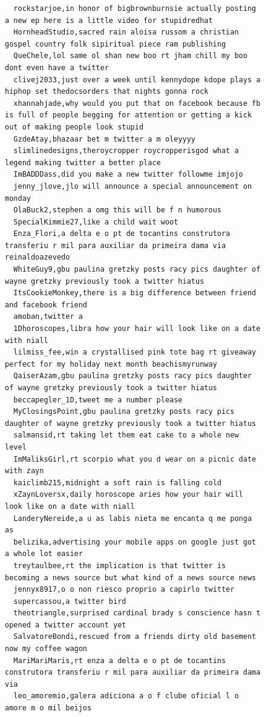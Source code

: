\begin{figure}[htpb]
\begin{verbatim}
  rockstarjoe,in honor of bigbrownburnsie actually posting a new ep here is a little video for stupidredhat
  HornheadStudio,sacred rain aloisa russom a christian gospel country folk sipiritual piece ram publishing
  QueChele,lol same ol shan new boo rt jham chill my boo dont even have a twitter
  clivej2033,just over a week until kennydope kdope plays a hiphop set thedocsorders that nights gonna rock
  xhannahjade,why would you put that on facebook because fb is full of people begging for attention or getting a kick out of making people look stupid
  GzdeAtay,bhazaar bet m twitter a m oleyyyy
  slimlinedesigns,theroycropper roycropperisgod what a legend making twitter a better place
  ImBADDDass,did you make a new twitter followme imjojo
  jenny_jlove,jlo will announce a special announcement on monday
  OlaBuck2,stephen a omg this will be f n humorous
  SpecialKimmie27,like a child wait woot
  Enza_Flori,a delta e o pt de tocantins construtora transferiu r mil para auxiliar da primeira dama via reinaldoazevedo
  WhiteGuy9,gbu paulina gretzky posts racy pics daughter of wayne gretzky previously took a twitter hiatus
  ItsCookieMonkey,there is a big difference between friend and facebook friend
  amoban,twitter a
  1Dhoroscopes,libra how your hair will look like on a date with niall
  lilmiss_fee,win a crystallised pink tote bag rt giveaway perfect for my holiday next month beachismyrunway
  QaiserAzam,gbu paulina gretzky posts racy pics daughter of wayne gretzky previously took a twitter hiatus
  beccapegler_1D,tweet me a number please
  MyClosingsPoint,gbu paulina gretzky posts racy pics daughter of wayne gretzky previously took a twitter hiatus
  salmansid,rt taking let them eat cake to a whole new level
  ImMaliksGirl,rt scorpio what you d wear on a picnic date with zayn
  kaiclimb215,midnight a soft rain is falling cold
  xZaynLoversx,daily horoscope aries how your hair will look like on a date with niall
  LanderyNereide,a u as labis nieta me encanta q me ponga as
  belizika,advertising your mobile apps on google just got a whole lot easier
  treytaulbee,rt the implication is that twitter is becoming a news source but what kind of a news source news
  jennyx8917,o o non riesco proprio a capirlo twitter
  supercassou,a twitter bird
  theotriangle,surprised cardinal brady s conscience hasn t opened a twitter account yet
  SalvatoreBondi,rescued from a friends dirty old basement now my coffee wagon
  MariMariMaris,rt enza a delta e o pt de tocantins construtora transferiu r mil para auxiliar da primeira dama via
  leo_amoremio,galera adiciona a o f clube oficial l o amore m o mil beijos

\end{verbatim}
\end{figure}
